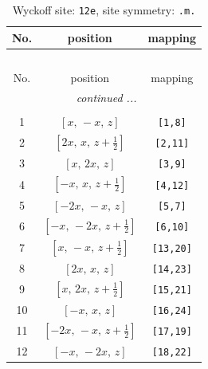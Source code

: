 \documentclass[fleqn,8pt]{jsarticle}
\begin{document}
\begin{longtable}{ccc}
\caption{Wyckoff site: {\tt 12e}, site symmetry: {\tt .m.}}
 \\
 \hline \hline
No. & position & mapping \\ \hline \endfirsthead

\multicolumn{2}{l}{\tablename\ \thetable{}} \\
 \hline \hline
No. & position & mapping \\ \hline \endhead

 \hline \hline
\multicolumn{2}{r}{\footnotesize\it continued ...} \\ \endfoot

 \hline \hline
\multicolumn{2}{r}{} \\ \endlastfoot

1 & $\left[ x,\, - x,\, z \right]$ & {\tt [1,8]} \\ \hline
2 & $\left[ 2 x,\, x,\, z + \frac{1}{2} \right]$ & {\tt [2,11]} \\ \hline
3 & $\left[ x,\, 2 x,\, z \right]$ & {\tt [3,9]} \\ \hline
4 & $\left[ - x,\, x,\, z + \frac{1}{2} \right]$ & {\tt [4,12]} \\ \hline
5 & $\left[ - 2 x,\, - x,\, z \right]$ & {\tt [5,7]} \\ \hline
6 & $\left[ - x,\, - 2 x,\, z + \frac{1}{2} \right]$ & {\tt [6,10]} \\ \hline
7 & $\left[ x,\, - x,\, z + \frac{1}{2} \right]$ & {\tt [13,20]} \\ \hline
8 & $\left[ 2 x,\, x,\, z \right]$ & {\tt [14,23]} \\ \hline
9 & $\left[ x,\, 2 x,\, z + \frac{1}{2} \right]$ & {\tt [15,21]} \\ \hline
10 & $\left[ - x,\, x,\, z \right]$ & {\tt [16,24]} \\ \hline
11 & $\left[ - 2 x,\, - x,\, z + \frac{1}{2} \right]$ & {\tt [17,19]} \\ \hline
12 & $\left[ - x,\, - 2 x,\, z \right]$ & {\tt [18,22]} \\
\end{longtable}
\renewcommand{\arraystretch}{1.2}
\end{document}
